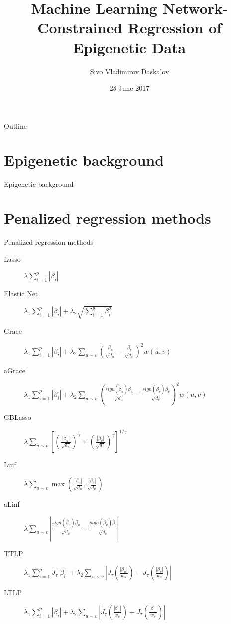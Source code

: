 \documentclass{beamer}
\title{Machine Learning Network-Constrained Regression of Epigenetic Data}
\author{Sivo Vladimirov Daskalov}
\institute{Corpus Christi College}
\date{28 June 2017}
\begin{document}
	
\begin{frame}
	\titlepage
\end{frame}

\begin{frame}{Outline}
  \tableofcontents
\end{frame}





\section{Epigenetic background}
\begin{frame}{Epigenetic background}
\end{frame}





\section{Penalized regression methods}
\begin{frame}{Penalized regression methods}
\small
\begin{description}
	\item[Lasso] $\lambda\sum_{i=1}^{p}\left|\beta_i\right|$
	\item[Elastic Net] $\lambda_1\sum_{i=1}^{p}\left|\beta_i\right| + \lambda_2\sqrt{\sum_{i=1}^{p}\beta_i^2}$
	\item[Grace] $\lambda_1\sum_{i=1}^{p}\left|\beta_i\right| + \lambda_2\sum_{u \sim v}\left(\frac{\beta_u}{\sqrt{d_u}}-\frac{\beta_v}{\sqrt{d_v}}\right)^2w(u,v)$
	\item[aGrace] $\lambda_1\sum_{i=1}^{p}\left|\beta_i\right| + \lambda_2\sum_{u \sim v}\left(\frac{sign(\tilde{\beta}_u)\beta_u}{\sqrt{d_u}}-\frac{sign(\tilde{\beta}_v)\beta_v}{\sqrt{d_v}}\right)^2w(u,v)$
	\item[GBLasso] $\lambda\sum_{u \sim v}
	\left[\left(\frac{|\beta_u|}{\sqrt{d_u}}\right)^\gamma+
	\left(\frac{|\beta_v|}{\sqrt{d_v}}\right)^\gamma\right]^{1/\gamma}$
	\item[Linf] $\lambda\sum_{u \sim v}\max\left(\frac{|\beta_u|}{\sqrt{d_u}},\frac{|\beta_v|}{\sqrt{d_v}}\right)$
	\item[aLinf] $\lambda\sum_{u \sim v}\left|\frac{sign(\tilde{\beta}_u)\beta_u}{\sqrt{d_u}}-\frac{sign(\tilde{\beta}_v)\beta_v}{\sqrt{d_v}}\right|$
	\item[TTLP] $\lambda_1 \sum_{i=1}^{p} J_\tau|\beta_i| + \lambda_2 \sum_{u \sim v} \left|J_\tau\left(\frac{|\beta_u|}{w_u}\right)-J_\tau\left(\frac{|\beta_v|}{w_v}\right)\right|$
	\item[LTLP] $\lambda_1 \sum_{i=1}^{p}\left|\beta_i\right| + \lambda_2 \sum_{u \sim v} \left|J_\tau\left(\frac{|\beta_u|}{w_u}\right)-J_\tau\left(\frac{|\beta_v|}{w_v}\right)\right|$
\end{description}
\normalsize
\end{frame}
\end{document}
